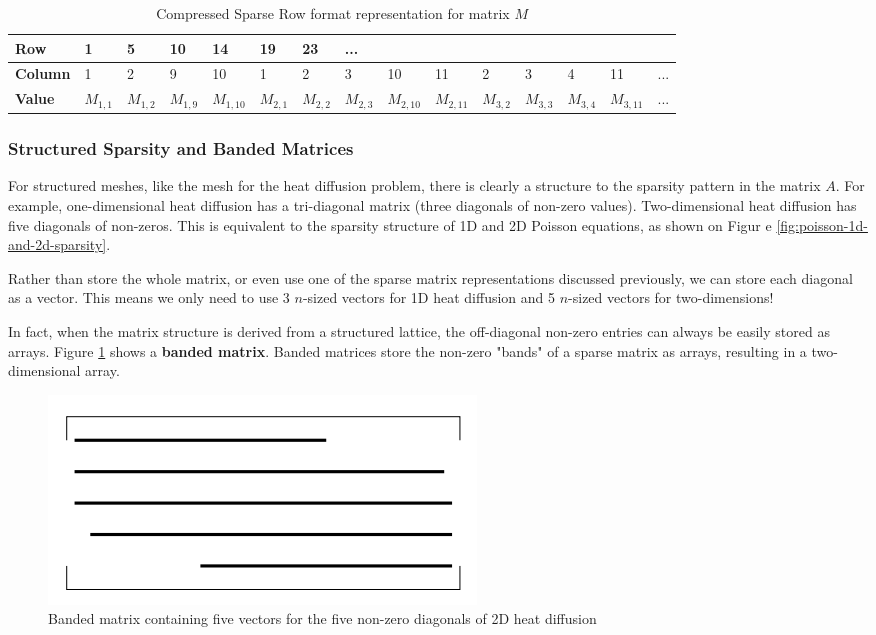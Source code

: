 \documentclass{article}
\begin{document}
\begin{table}
	\centering
	\begin{tabular}{|l|llllllllllllll|}
		\hline
		\textbf{Row} & 1 & 5 & 10 & 14 & 19 & 23 & ... &&&&&&& \\
		\hline
		\textbf{Column} & 1 & 2 & 9 & 10 & 1 & 2 & 3 & 10 & 11 & 2 & 3 & 4 & 11 & ... \\
		\hline
		\textbf{Value} & $M_{1,1}$ & $M_{1,2}$ & $M_{1,9}$ & $M_{1,10}$ & $M_{2,1}$ & $M_{2,2}$ & $M_{2,3}$ & $M_{2,10}$ & $M_{2,11}$ & $M_{3,2}$ & $M_{3,3}$ & $M_{3,4}$ & $M_{3,11}$ & ... \\
		\hline
	\end{tabular}
	\caption{Compressed Sparse Row format representation for matrix $M$}
	\label{tab:compressed-sparse-row-format}
\end{table}

\subsubsection{Structured Sparsity and Banded Matrices}

For structured meshes, like the mesh for the heat diffusion problem, there is clearly a structure to the sparsity pattern in the matrix $A$. For example, one-dimensional heat diffusion has a tri-diagonal matrix (three diagonals of non-zero values). Two-dimensional heat diffusion has five diagonals of non-zeros.  This is equivalent to the sparsity structure of 1D and 2D Poisson equations, as shown on Figur e \ref{fig:poisson-1d-and-2d-sparsity}.

Rather than store the whole matrix, or even use one of the sparse matrix representations discussed previously, we can store each diagonal as a vector. This means we only need to use 3 $n$-sized vectors for 1D heat diffusion and 5 $n$-sized vectors for two-dimensions!

In fact, when the matrix structure is derived from a structured lattice, the off-diagonal non-zero entries can always be easily stored as arrays. Figure \ref{fig:banded-matrix} shows a \textbf{banded matrix}. Banded matrices store the non-zero "bands" of a sparse matrix as arrays, resulting in a two-dimensional array.

\begin{figure}
	\centering
	\includegraphics[scale=0.4]{figures/banded-matrix.png}
	\caption{Banded matrix containing five vectors for the five non-zero diagonals of 2D heat diffusion}
	\label{fig:banded-matrix}
\end{figure}
\end{document}
